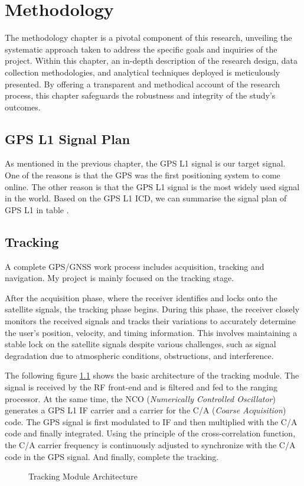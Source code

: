 \chapter{Methodology}
The methodology chapter is a pivotal component of this research, unveiling the systematic approach taken to address the specific goals and inquiries of the project. Within this chapter, an in-depth description of the research design, data collection methodologies, and analytical techniques deployed is meticulously presented. By offering a transparent and methodical account of the research process, this chapter safeguards the robustness and integrity of the study's outcomes.

\section{GPS L1 Signal Plan}
As mentioned in the previous chapter, the GPS L1 signal is our target signal. One of the reasons is that the GPS was the first positioning  system to come online\cite{RN184}. The other reason is that the GPS L1 signal is the most widely used signal in the world. 
Based on the GPS L1 ICD\cite{RN170}, we can summarise the signal plan of GPS L1 in table .




\section{Tracking}
A complete GPS/GNSS work process includes acquisition, tracking and navigation. My project is mainly focused on the tracking stage.

After the acquisition phase, where the receiver identifies and locks onto the satellite signals, the tracking phase begins. During this phase, the receiver closely monitors the received signals and tracks their variations to accurately determine the user's position, velocity, and timing information. This involves maintaining a stable lock on the satellite signals despite various challenges, such as signal degradation due to atmospheric conditions, obstructions, and interference.

The following figure \ref{fig:tracking_digram} shows the basic architecture of the tracking module. The signal is received by the RF front-end and is filtered and fed to the ranging processor. At the same time, the NCO (\textit{Numerically Controlled Oscillator}) generates a GPS L1 IF carrier and a carrier for the C/A (\textit{Coarse Acquisition}) code. The GPS signal is first modulated to IF and then multiplied with the C/A code and finally integrated. Using the principle of the cross-correlation function, the C/A carrier frequency is continuously adjusted to synchronize with the C/A code in the GPS signal. And finally, complete the tracking\cite{RN151}.
\begin{figure}[!h]
    \centering
    
    \caption{Tracking Module Architecture}
    \label{fig:tracking_digram}
\end{figure}

